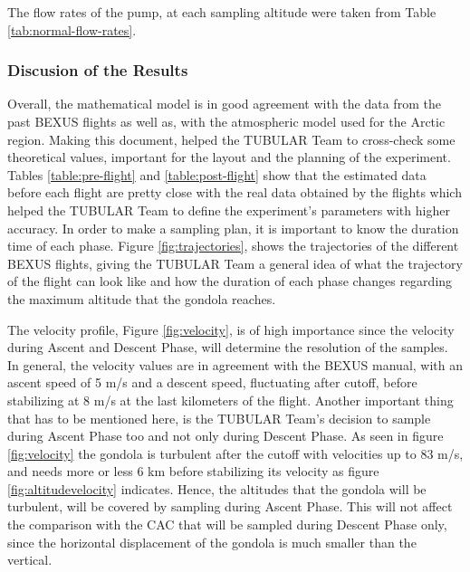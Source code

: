 The flow rates of the pump, at each sampling altitude were taken from Table \ref{tab:normal-flow-rates}.




\subsubsection{Discusion of the Results}
Overall, the mathematical model is in good agreement with the data from the past BEXUS flights as well as, with the atmospheric model used for the Arctic region.
Making this document, helped the TUBULAR Team to cross-check some theoretical values, important for the layout and the planning of the experiment. Tables \ref{table:pre-flight} and \ref{table:post-flight} show that the estimated data before each flight are pretty close with the real data obtained by the flights which helped the TUBULAR Team to define the experiment's parameters with higher accuracy. 
In order to make a sampling plan, it is important to know the duration time of each phase. Figure \ref{fig:trajectories}, shows the trajectories of the different BEXUS flights, giving the TUBULAR Team a general idea of what the trajectory of the flight can look like and how the duration of each phase changes regarding the maximum altitude that the gondola reaches.

The velocity profile, Figure \ref{fig:velocity}, is of high importance since the velocity during Ascent and Descent Phase, will determine the resolution of the samples. In general, the velocity values are in agreement with the BEXUS manual, with an ascent speed of 5 m/s and a descent speed, fluctuating after cutoff, before stabilizing at 8 m/s at the last kilometers of the flight. Another important thing that has to be mentioned here, is the TUBULAR Team's decision to sample during Ascent Phase too and not only during Descent Phase. As seen in figure \ref{fig:velocity} the gondola is turbulent after the cutoff with velocities up to 83 m/s, and needs more or less 6 km before stabilizing its velocity as figure \ref{fig:altitudevelocity} indicates. Hence, the altitudes that the gondola will be turbulent, will be covered by sampling during Ascent Phase. This will not affect the comparison with the CAC that will be sampled during Descent Phase only, since the horizontal displacement of the gondola is much smaller than the vertical. 

